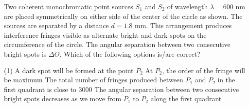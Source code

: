 

    \item Two coherent monochromatic point sources \(S_1\) and \(S_2\) of wavelength \(\lambda = 600 \text{ nm}\) are placed symmetrically on either side of the center of the circle as shown. The sources are separated by a distance \(d = 1.8 \text{ mm}\). This arrangement produces interference fringes visible as alternate bright and dark spots on the circumference of the circle. The angular separation between two consecutive bright spots is \(\Delta\Theta\). Which of the following options is/are correct?
        \begin{tasks}(1)
            \task A dark spot will be formed at the point \(P_2\)
            \task At \(P_2\), the order of the fringe will be maximum
            \task The total number of fringes produced between \(P_1\) and \(P_2\) in the first quadrant is close to 3000
            \task The angular separation between two consecutive bright spots decreases as we move from \(P_1\) to \(P_2\) along the first quadrant
        \end{tasks}


\begin{center}
\end{center}
